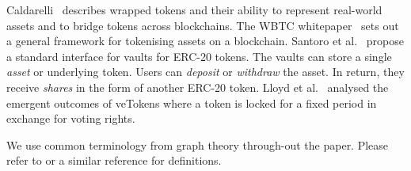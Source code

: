 Caldarelli~\cite{caldarelli-21} describes wrapped tokens and their
ability to represent real-world assets and to bridge tokens across
blockchains.  The WBTC whitepaper~\cite{kyber-et-al-xx} sets out a
general framework for tokenising assets on a blockchain.  Santoro et
al.~\cite{santoro-et-al-22} propose a standard interface for vaults
for ERC-20 tokens.  The vaults can store a single \textit{asset} or
underlying token.  Users can \textit{deposit} or \textit{withdraw} the
asset.  In return, they receive \textit{shares} in the form of another
ERC-20 token.  Lloyd et al.~\cite{lloyd-et-al-23} analysed the
emergent outcomes of veTokens where a token is locked for a fixed
period in exchange for voting rights.

We use common terminology from graph theory through-out the paper.
Please refer to \cite{diestel-17} or a similar reference for
definitions.
